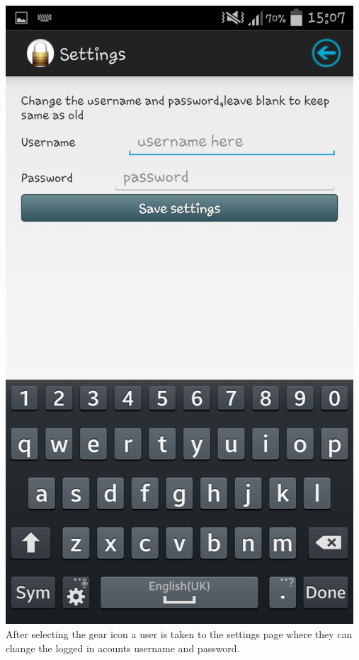 \begin{center}
 \includegraphics[width=13cm]{screenshots/normal/4_Settings.png}
 After selecting the gear icon a user is taken to the settings page where they can change the logged in acounts username and password.
\end{center}
